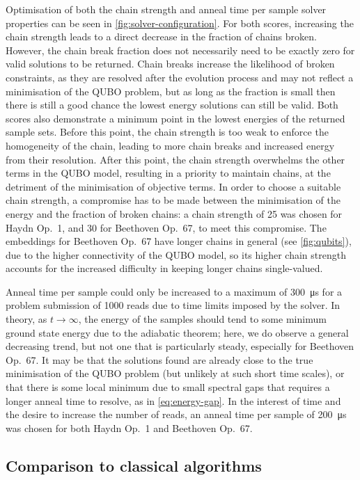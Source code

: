 \documentclass[12pt]{article}
\theoremstyle{definition}
\begin{document}
Optimisation of both the chain strength and anneal time per sample solver properties can be seen in \cref{fig:solver-configuration}. For both scores, increasing the chain strength leads to a direct decrease in the fraction of chains broken. However, the chain break fraction does not necessarily need to be exactly zero for valid solutions to be returned. Chain breaks increase the likelihood of broken constraints, as they are resolved after the evolution process and may not reflect a minimisation of the QUBO problem, but as long as the fraction is small then there is still a good chance the lowest energy solutions can still be valid. Both scores also demonstrate a minimum point in the lowest energies of the returned sample sets. Before this point, the chain strength is too weak to enforce the homogeneity of the chain, leading to more chain breaks and increased energy from their resolution. After this point, the chain strength overwhelms the other terms in the QUBO model, resulting in a priority to maintain chains, at the detriment of the minimisation of objective terms. In order to choose a suitable chain strength, a compromise has to be made between the minimisation of the energy and the fraction of broken chains: a chain strength of \num{25} was chosen for Haydn Op.\ 1, and \num{30} for Beethoven Op.\ 67, to meet this compromise. The embeddings for Beethoven Op.\ 67 have longer chains in general (see \cref{fig:qubits}), due to the higher connectivity of the QUBO model, so its higher chain strength accounts for the increased difficulty in keeping longer chains single-valued.

Anneal time per sample could only be increased to a maximum of \qty{300}{\us} for a problem submission of \num{1000} reads due to time limits imposed by the solver. In theory, as $t\to\infty$, the energy of the samples should tend to some minimum ground state energy due to the adiabatic theorem; here, we do observe a general decreasing trend, but not one that is particularly steady, especially for Beethoven Op.\ 67. It may be that the solutions found are already close to the true minimisation of the QUBO problem (but unlikely at such short time scales), or that there is some local minimum due to small spectral gaps that requires a longer anneal time to resolve, as in \cref{eq:energy-gap}. In the interest of time and the desire to increase the number of reads, an anneal time per sample of \qty{200}{\us} was chosen for both Haydn Op.\ 1 and Beethoven Op.\ 67.

\subsection{Comparison to classical algorithms}
\end{document}
